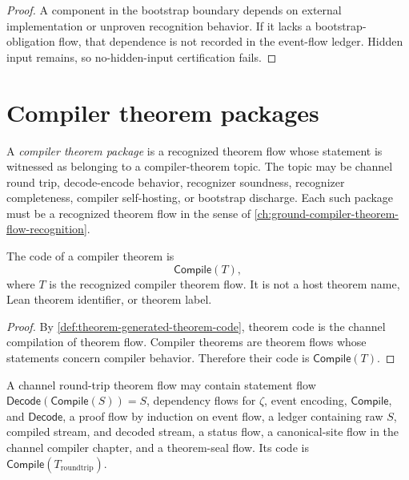 \begin{proof}
A component in the bootstrap boundary depends on external implementation or unproven recognition behavior. If it lacks a bootstrap-obligation flow, that dependence is not recorded in the event-flow ledger. Hidden input remains, so no-hidden-input certification fails.
\end{proof}

\section{Compiler theorem packages}
\label{sec:self-hosting-compiler-theorem-packages}

\begin{definition}
\label{def:self-hosting-compiler-theorem-package}
A \emph{compiler theorem package} is a recognized theorem flow whose statement is witnessed as belonging to a compiler-theorem topic. The topic may be channel round trip, decode-encode behavior, recognizer soundness, recognizer completeness, compiler self-hosting, or bootstrap discharge. Each such package must be a recognized theorem flow in the sense of \autoref{ch:ground-compiler-theorem-flow-recognition}.
\end{definition}

\begin{proposition}
\label{prop:self-hosting-compiler-theorem-code}
The code of a compiler theorem is
$$
  \mathsf{Compile}(T),
$$
where $T$ is the recognized compiler theorem flow. It is not a host theorem name, Lean theorem identifier, or theorem label.
\end{proposition}

\begin{proof}
By \autoref{def:theorem-generated-theorem-code}, theorem code is the channel compilation of theorem flow. Compiler theorems are theorem flows whose statements concern compiler behavior. Therefore their code is $\mathsf{Compile}(T)$.
\end{proof}

\begin{example}
\label{ex:self-hosting-compiler-channel-roundtrip-theorem}
A channel round-trip theorem flow may contain statement flow $\mathsf{Decode}(\mathsf{Compile}(S))=S$, dependency flows for $\zeta$, event encoding, $\mathsf{Compile}$, and $\mathsf{Decode}$, a proof flow by induction on event flow, a ledger containing raw $S$, compiled stream, and decoded stream, a status flow, a canonical-site flow in the channel compiler chapter, and a theorem-seal flow. Its code is $\mathsf{Compile}(T_{\mathrm{roundtrip}})$.
\end{example}

